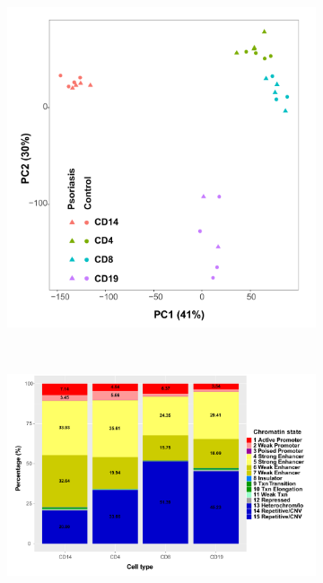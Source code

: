 \bigskip
\begin{figure}[htbp]
\centering
\begin{subfigure}[b]{0.6\textwidth}
\centering 
\includegraphics[width=\textwidth]{./Results2/pdfs/ChIPm_H3K27ac_all_cell_types_filtered_PCA}
\caption{}
\end{subfigure}
~
\begin{subfigure}[b]{0.6\textwidth} 
\centering
\includegraphics[width=\textwidth]{./Results2/pdfs/ChIPm_H3K27ac_cell_type_specific_master_list_chromatin_states_annotated_filtered}

\end{subfigure}
\end{figure}
